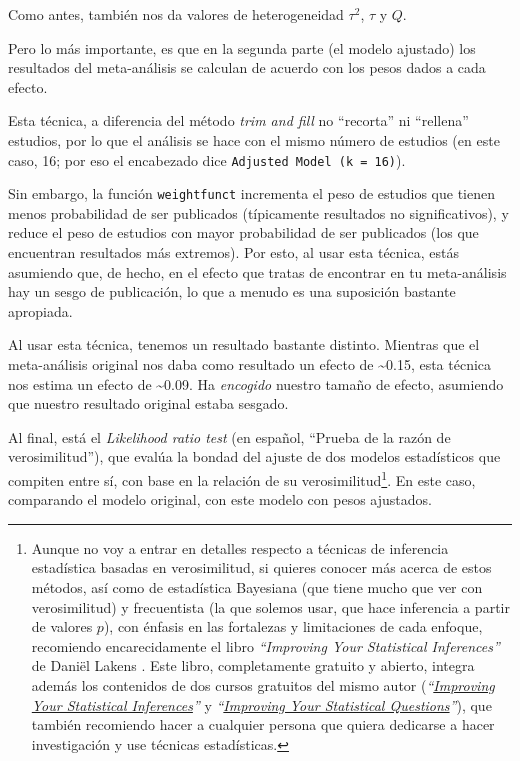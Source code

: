 \documentclass[
  bookmarksnumbered]{article}
\begin{document}
Como antes, también nos da valores de heterogeneidad \(\tau^2\), \(\tau\) y \(Q\).

Pero lo más importante, es que en la segunda parte (el modelo ajustado) los resultados del meta-análisis se calculan de acuerdo con los pesos dados a cada efecto.

Esta técnica, a diferencia del método \emph{trim and fill} no ``recorta'' ni ``rellena'' estudios, por lo que el análisis se hace con el mismo número de estudios (en este caso, 16; por eso el encabezado dice \texttt{Adjusted\ Model\ (k\ =\ 16)}).

Sin embargo, la función \texttt{weightfunct} incrementa el peso de estudios que tienen menos probabilidad de ser publicados (típicamente resultados no significativos), y reduce el peso de estudios con mayor probabilidad de ser publicados (los que encuentran resultados más extremos). Por esto, al usar esta técnica, estás asumiendo que, de hecho, en el efecto que tratas de encontrar en tu meta-análisis hay un sesgo de publicación, lo que a menudo es una suposición bastante apropiada.

Al usar esta técnica, tenemos un resultado bastante distinto. Mientras que el meta-análisis original nos daba como resultado un efecto de \textasciitilde0.15, esta técnica nos estima un efecto de \textasciitilde0.09. Ha \emph{encogido} nuestro tamaño de efecto, asumiendo que nuestro resultado original estaba sesgado.

Al final, está el \emph{Likelihood ratio test} (en español, ``Prueba de la razón de verosimilitud''), que evalúa la bondad del ajuste de dos modelos estadísticos que compiten entre sí, con base en la relación de su verosimilitud\footnote{Aunque no voy a entrar en detalles respecto a técnicas de inferencia estadística basadas en verosimilitud, si quieres conocer más acerca de estos métodos, así como de estadística Bayesiana (que tiene mucho que ver con verosimilitud) y frecuentista (la que solemos usar, que hace inferencia a partir de valores \(p\)), con énfasis en las fortalezas y limitaciones de cada enfoque, recomiendo encarecidamente el libro \emph{``Improving Your Statistical Inferences''} de Daniël Lakens \autocite*{lakensImprovingYourStatistical2022}. Este libro, completamente gratuito y abierto, integra además los contenidos de dos cursos gratuitos del mismo autor (\emph{``\href{https://www.coursera.org/learn/statistical-inferences}{Improving Your Statistical Inferences}''} y \emph{``\href{https://www.coursera.org/learn/improving-statistical-questions}{Improving Your Statistical Questions}''}), que también recomiendo hacer a cualquier persona que quiera dedicarse a hacer investigación y use técnicas estadísticas.}. En este caso, comparando el modelo original, con este modelo con pesos ajustados.
\end{document}
